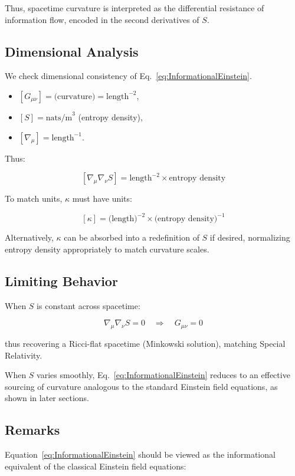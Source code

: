 \documentclass{article}
\begin{document}
Thus, spacetime curvature is interpreted as the differential resistance of information flow, encoded in the second derivatives of $S$.

\subsection{Dimensional Analysis}

We check dimensional consistency of Eq.~\eqref{eq:InformationalEinstein}.
\begin{itemize}
\item $[G_{\mu\nu}] = \text{(curvature)} = \text{length}^{-2}$,
\item $[S] = \text{nats/m}^3$ (entropy density),
\item $[\nabla_\mu] = \text{length}^{-1}$.
\end{itemize}

Thus:

\[
[\nabla_\mu \nabla_\nu S] = \text{length}^{-2} \times \text{entropy density}
\]

To match units, $\kappa$ must have units:

\[
[\kappa] = \text{(length)}^{-2} \times \text{(entropy density)}^{-1}
\]

Alternatively, $\kappa$ can be absorbed into a redefinition of $S$ if desired, normalizing entropy density appropriately to match curvature scales.

\subsection{Limiting Behavior}

When $S$ is constant across spacetime:

\[
\nabla_\mu \nabla_\nu S = 0
\quad \Rightarrow \quad G_{\mu\nu} = 0
\]

thus recovering a Ricci-flat spacetime (Minkowski solution), matching Special Relativity.

When $S$ varies smoothly, Eq.~\eqref{eq:InformationalEinstein} reduces to an effective sourcing of curvature analogous to the standard Einstein field equations, as shown in later sections.

\subsection{Remarks}

Equation~\eqref{eq:InformationalEinstein} should be viewed as the informational equivalent of the classical Einstein field equations:
\end{document}

